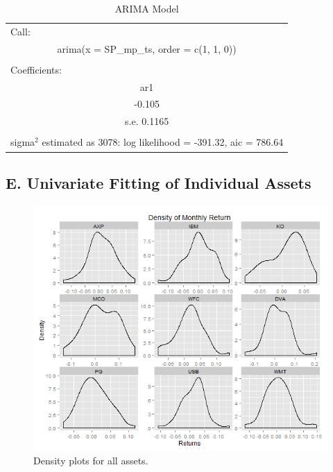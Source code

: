 \documentclass[10pt]{article_simple}
\begin{document}
\setcounter{table}{11}
\makeatletter
\renewcommand{\thetable}{S\arabic{table}}


\begin{table}[htbp]
  \centering
  \caption{ARIMA Model}
    \begin{tabular}{r}
    \multicolumn{1}{l}{Call:} \\
    \multicolumn{1}{c}{arima(x = SP\_mp\_ts, order = c(1, 1, 0))} \\
    \multicolumn{1}{c}{} \\
    \multicolumn{1}{l}{Coefficients:} \\
    \multicolumn{1}{c}{ar1} \\
    \multicolumn{1}{c}{-0.105} \\
    \multicolumn{1}{c}{s.e.   0.1165} \\
    \multicolumn{1}{c}{} \\
    \multicolumn{1}{c}{sigma$^2$ estimated as 3078:  log likelihood = -391.32,  aic = 786.64 } \\
    \end{tabular}%
\end{table}%

\subsection*{E. Univariate Fitting of Individual Assets}

\begin{figure}[H]
	\centering
  	\includegraphics[width=.85\linewidth]{Density_of_Monthl_Return}
  	\centering
  	\caption{Density plots for all assets.}
\end{figure}
\end{document}
